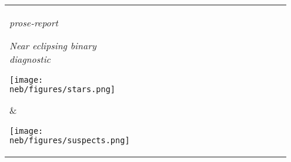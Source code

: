 {\selectfont

\begin{tabular}{m{0.3\linewidth}m{0.65\linewidth}}
  \parbox{\linewidth}{
    {\textcolor{gray!50}{\small\textit{prose-report}}}

    \vspace{0.2cm}
    {\LARGE {}}

    \vspace{-0.1cm}
    {\footnotesize\textit{Near eclipsing binary diagnostic}}


    \mbox{\hspace{-0.7cm}\texttt{[image: neb/figures/stars.png]}}
    \vspace{-1cm}\newline

  } & \hspace{0.7cm}\parbox{\linewidth}{
    \mbox{\hspace{-1cm}\texttt{[image: neb/figures/suspects.png]}}
  } \\
\end{tabular}
}